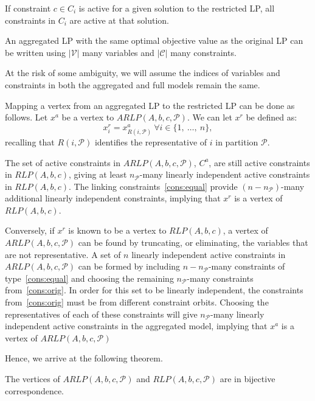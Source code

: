 \documentclass[runningheads]{llncs}
\newcommand{\cP}{{\mathcal P}}
\newcommand{\cC}{{\mathcal C}}
\newcommand{\cV}{{\mathcal V}}
\begin{document}
\begin{corollary} \label{cor:cons_equal}
	If constraint $c \in C_i$ is active for a given solution to the restricted LP, all constraints in $C_i$ are active at that solution.
\end{corollary}


\begin{corollary}
	An aggregated LP with the same optimal objective
	value as the original LP can be written using $|\cV|$ many variables and $|\cC|$ many constraints.
\end{corollary}



At the risk of some ambiguity, we will assume the indices of variables and constraints in both the aggregated and full models remain the same.


Mapping a vertex from an aggregated LP to the restricted LP can be done as follows. Let $x^a$ be a vertex to $ARLP(A,b,c,\cP)$. We can let $x^r$ be defined as:
$$x_i^r = x_{R(i,\cP)}^a \ \forall i \in \{1,\ \ldots,\ n\}, $$
recalling that $R(i,\cP)$ identifies the representative of $i$ in partition $\cP$.

 The set of active constraints in $ARLP(A,b,c,\cP)$, $C^a$, are still active constraints in $RLP(A,b,c)$, giving at least $n_\cP$-many linearly independent active constraints in $RLP(A,b,c)$. The linking constraints~\eqref{cons:equal} provide $(n-n_\cP)$-many additional linearly independent constraints, implying that $x^r$ is a vertex of $RLP(A,b,c)$.
 
 Conversely, if $x^r$ is known to be a vertex to $RLP(A,b,c)$, a vertex of $ARLP(A,b,c,\cP)$ can be found by truncating, or eliminating, the variables that are not representative. A set of $n$ linearly independent active constraints in $ARLP(A,b,c,\cP)$ can be formed by including $n-n_\cP$-many constraints of type~\eqref{cons:equal} and choosing the remaining $n_\cP$-many constraints from~\eqref{cons:orig}. In order for this set to be linearly independent, the constraints from~\eqref{cons:orig} must be from different constraint orbits. Choosing the representatives of each of these constraints will give $n_\cP$-many linearly independent active constraints in the aggregated model, implying that $x^a$ is a vertex of $ARLP(A,b,c,\cP)$

Hence, we arrive at the following theorem.
\begin{theorem}\label{thm:VertexBijection}
	The vertices of $ARLP(A,b,c,\cP)$ and $RLP(A,b,c,\cP)$ are in bijective correspondence.
\end{theorem}
\end{document}

